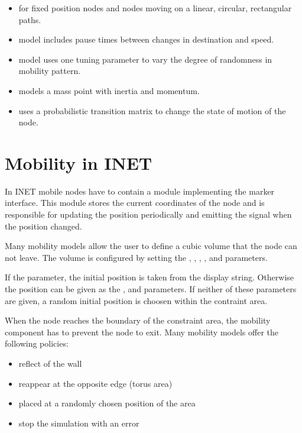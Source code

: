 \begin{itemize}
\item {} for fixed position nodes and nodes
      moving on a linear, circular, rectangular paths.
\item {} model includes pause times between changes
      in destination and speed.
\item {} model uses one tuning parameter to vary the degree
      of randomness in mobility pattern.
\item {} models a mass point with inertia and momentum.
\item {} uses a probabilistic transition matrix to change
      the state of motion of the node.
\end{itemize}

\section{Mobility in INET}

In INET mobile nodes have to contain a module implementing the
 marker interface. This module stores the current
coordinates of the node and is responsible for updating the position
periodically and emitting the  signal
when the position changed.

Many mobility models allow the user to define a cubic volume that the node 
can not leave. The volume is configured by setting the , 
, ,
,  and
 parameters.

If the  parameter, the initial position is taken from
the display string. Otherwise the position can be given as the ,
 and  parameters. If neither of these parameters
are given, a random initial position is choosen within the contraint area.

When the node reaches the boundary of the constraint area, the mobility
component has to prevent the node to exit. Many mobility models offer the 
following policies:

\begin{itemize}
  \item reflect of the wall
  \item reappear at the opposite edge (torus area)
  \item placed at a randomly chosen position of the area
  \item stop the simulation with an error
\end{itemize}

